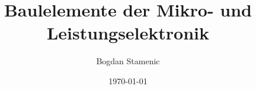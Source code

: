 

\newcommand{\FormelsammlungTitel}{Baulelemente der Mikro- und Leistungselektronik}
\newcommand{\FormelsammlungAutor}{Bogdan Stamenic}
\setcounter{tocdepth}{2} %


	\title{\FormelsammlungTitel}
	\author{\FormelsammlungAutor}
	\date{\today}
	\begin{multicols*}{2}
			\maketitle
			\tableofcontents
        
        
	\end{multicols*}

